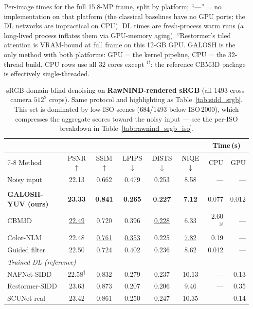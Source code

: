 \begin{table}[t]
\vspace{2pt}
{\footnotesize Per-image times for the full 15.8-MP frame, split by platform;
``---'' = no implementation on that platform (the classical baselines have no
GPU ports; the DL networks are impractical on CPU). DL times are fresh-process
warm runs (a long-lived process inflates them via GPU-memory aging).
$^{v}$Restormer's tiled attention is VRAM-bound at full frame on this 12-GB
GPU. GALOSH is the only method with both platforms: GPU = the kernel pipeline,
CPU = the 32-thread build. CPU rows use all 32 cores except $^{1t}$: the
reference CBM3D package is effectively single-threaded.}
\end{table}

\begin{table}[t]
\centering
\caption{sRGB-domain blind denoising on \textbf{RawNIND-rendered sRGB} (all
1493 cross-camera $512^2$ crops). Same protocol and highlighting as
Table~\ref{tab:sidd_srgb}. This set is dominated by low-ISO scenes (684/1493
below ISO\,2000), which compresses the aggregate scores toward the noisy input
--- see the per-ISO breakdown in Table~\ref{tab:rawnind_srgb_iso}.}
\label{tab:rawnind_srgb}
\setlength{\tabcolsep}{3.2pt}
\begin{tabular}{l ccccc rr}
\toprule
 & & & & & & \multicolumn{2}{c}{Time\,(s)}\\
\cmidrule(lr){7-8}
Method & PSNR$\uparrow$ & SSIM$\uparrow$ & LPIPS$\downarrow$ & DISTS$\downarrow$ & NIQE$\downarrow$ & CPU & GPU\\
\midrule
Noisy input                & 22.13 & 0.662 & 0.479 & 0.253 & 8.58 & --- & ---\\
\addlinespace[2pt]
\multicolumn{8}{l}{\textit{Blind, training-free}}\\
\quad \textbf{GALOSH-YUV (ours)} & \textbf{23.33} & \textbf{0.841} & \textbf{0.265} & \textbf{0.227} & \textbf{7.12} & 0.077 & 0.012\\
\quad CBM3D                & \underline{22.49} & 0.720 & 0.396 & \underline{0.228} & 6.33 & 2.60$^{1t}$ & ---\\
\quad Color-NLM            & 22.48 & \underline{0.761} & \underline{0.353} & 0.225 & \underline{7.82} & 0.19 & ---\\
\quad Guided filter        & 22.50 & 0.724 & 0.402 & 0.236 & 8.62 & 0.012 & ---\\
\midrule
\multicolumn{8}{l}{\textit{Trained DL (reference)}}\\
\quad NAFNet-SIDD          & 22.58$^{\dagger}$ & 0.832 & 0.279 & 0.237 & 10.13 & --- & 0.13\\
\quad Restormer-SIDD       & 23.63 & 0.873 & 0.207 & 0.206 & 9.46 & --- & 0.35\\
\quad SCUNet-real          & 23.42 & 0.861 & 0.250 & 0.247 & 10.35 & --- & 0.14\\
\bottomrule
\end{tabular}


\end{table}
